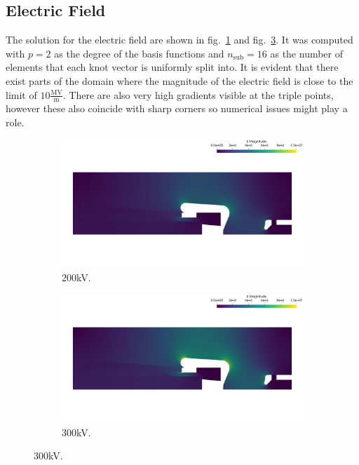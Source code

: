 \subsection{Electric Field}
The solution for the electric field are shown in fig.~\ref{fig:200kV_v6} and fig.~\ref{fig:300kV_v6}.
It was computed with $p=2$ as the degree of the basis functions and $n_\mathrm{sub}=16$ as the number of elements that each knot vector is uniformly split into.
It is evident that there exist parts of the domain where the magnitude of the electric field is close to the limit of $10 \frac{\mathrm{MV}}{\mathrm{m}}$. There are also very high gradients visible at the triple points, however these also coincide with sharp corners so numerical issues might play a role.

\begin{center}
\begin{figure}[H]
   \begin{subfigure}{0.45\textwidth}
      \includegraphics[width=\textwidth]{fig/200kV_v6}
      \caption{200kV.}
      \label{fig:200kV_v6}
   \end{subfigure}
   \begin{subfigure}{0.45\textwidth}
      \includegraphics[width=\textwidth]{fig/300kV_v6}
      \caption{300kV.}
      \label{fig:300kV_v6}
   \end{subfigure}
\end{figure}
\end{center}

